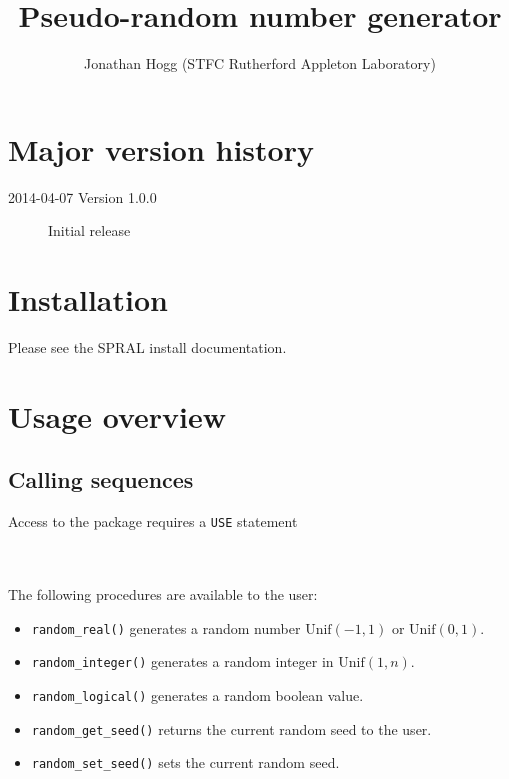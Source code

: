 
\title{Pseudo-random number generator}
\author{
   Jonathan Hogg (STFC Rutherford Appleton Laboratory) \\
}
\spralmaketitle
\thispagestyle{firststyle}

\section*{Major version history}
\begin{description}
\item[2014-04-07 Version 1.0.0] Initial release
\end{description}


\section{Installation}
Please see the SPRAL install documentation.


\section{Usage overview}

\subsection{Calling sequences}

Access to the package requires a {\tt USE} statement \\ \\
\indent\hspace{8mm}{\tt use spral\_random} \\

\medskip

\noindent
The following procedures are available to the user:
\begin{itemize}
\item {\tt random\_real()} generates a random number $\mathrm{Unif}(-1,1)$ or
   $\mathrm{Unif}(0,1)$.
\item {\tt random\_integer()} generates a random integer in $\mathrm{Unif}(1,n)$.
\item {\tt random\_logical()} generates a random boolean value.
\item {\tt random\_get\_seed()} returns the current random seed to the user.
\item {\tt random\_set\_seed()} sets the current random seed.
\end{itemize}

